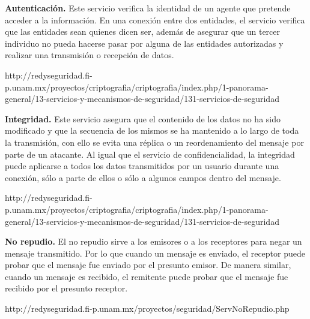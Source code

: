 \textbf{Autenticación. }
Este servicio verifica la identidad de un agente que pretende acceder a la información. En una conexión entre dos entidades, el servicio verifica que las entidades sean quienes dicen ser, además de asegurar que un tercer individuo no pueda hacerse pasar por alguna de las entidades autorizadas y realizar una transmisión o recepción de datos.

http://redyseguridad.fi-p.unam.mx/proyectos/criptografia/criptografia/index.php/1-panorama-general/13-servicios-y-mecanismos-de-seguridad/131-servicios-de-seguridad

\textbf{Integridad. }
Este servicio asegura que el contenido de los datos no ha sido modificado y que la secuencia de los mismos se ha mantenido a lo largo de toda la transmisión, con ello se evita una réplica o un reordenamiento del mensaje por parte de un atacante.
Al igual que el servicio de confidencialidad, la integridad puede aplicarse a todos los datos transmitidos por un usuario durante una conexión, sólo a parte de ellos o sólo a algunos campos dentro del mensaje.

http://redyseguridad.fi-p.unam.mx/proyectos/criptografia/criptografia/index.php/1-panorama-general/13-servicios-y-mecanismos-de-seguridad/131-servicios-de-seguridad

\textbf{No repudio. }
El no repudio sirve a los emisores o a los receptores para negar un mensaje transmitido. Por lo que cuando un mensaje es enviado, el receptor puede probar que el mensaje fue enviado por el presunto emisor. De manera similar, cuando un mensaje es recibido, el remitente puede probar que el mensaje fue recibido por el presunto receptor.

http://redyseguridad.fi-p.unam.mx/proyectos/seguridad/ServNoRepudio.php

